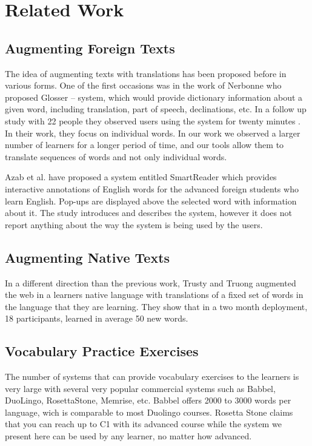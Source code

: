 
\newpage
\section{Related Work}


\subsection{Augmenting Foreign Texts}
The idea of augmenting texts with translations has been proposed before in various forms. One of the first occasions was in the work of Nerbonne \cite{Nerb99-Assistant} who proposed Glosser -- system, which would provide dictionary information about a given word, including translation, part of speech, declinations, etc. In a follow up study with 22 people they observed users using the system for twenty minutes \cite{Dokter98-UserStudy}. In their work, they focus on individual words. In our work we observed a larger number of learners for a longer period of time, and our tools allow them to translate sequences of words and not only individual words. 

Azab et al. \cite{Azab13-nlp} have proposed a system entitled SmartReader which provides interactive annotations of English words for the advanced foreign students who learn English. Pop-ups are displayed above the selected word with information about it. The study introduces and describes the system, however it does not report anything about the way the system is being used by the users.

\subsection{Augmenting Native Texts}
In a different direction than the previous work, Trusty and Truong augmented the web in a learners native language with translations of a fixed set of words in the language that they are learning\cite{Trus11web}. They show that in a two month deployment, 18 participants, learned in average 50 new words.

\subsection{Vocabulary Practice Exercises}
The number of systems that can provide vocabulary exercises to the learners is very large with several very popular commercial systems such as Babbel, DuoLingo, RosettaStone, Memrise, etc. Babbel offers 2000 to 3000 words per language, wich is comparable to most Duolingo courses. Rosetta Stone claims that you can reach up to C1 with its advanced course while the system we present here can be used by any learner, no matter how advanced. 

